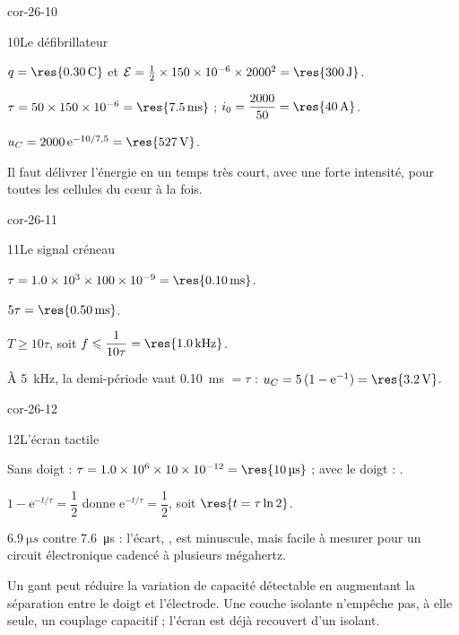 \begin{blocLivre}{cor-26-10}
\begin{corrige}{10}{Le défibrillateur}
\begin{questions}
\item $q=\res{\qty{0,30}{C}}$ et $\mathcal{E}=\frac12\times\num{150e-6}\times2000^2=\res{\qty{300}{J}}$.
\item $\tau=50\times\num{150e-6}=\res{\qty{7,5}{ms}}$ ; $i_0=\dfrac{2000}{50}=\res{\qty{40}{A}}$.
\item $u_C=2000\,\mathrm{e}^{-10/7{,}5}=\res{\qty{527}{V}}$.
\item Il faut délivrer l'énergie en un temps très court, avec une forte intensité, pour  toutes les
cellules du cœur à la fois.
\end{questions}
\end{corrige}
\end{blocLivre}
\begin{blocLivre}{cor-26-11}
\begin{corrige}{11}{Le signal créneau}
\begin{questions}
\item $\tau=\num{1.0e3}\times\num{100e-9}=\res{\qty{0,10}{ms}}$.
\item $5\tau=\res{\qty{0,50}{ms}}$.
\item $T\geqslant10\tau$, soit $f\leqslant\dfrac{1}{10\tau}=\res{\qty{1,0}{kHz}}$.
\item À \qty{5}{kHz}, la demi-période vaut \qty{0,10}{ms} $=\tau$ : $u_C=5\,(1-\mathrm{e}^{-1})=\res{\qty{3,2}{V}}$.
\end{questions}
\end{corrige}
\end{blocLivre}
\begin{blocLivre}{cor-26-12}
\begin{corrige}{12}{L'écran tactile}
\begin{questions}
\item Sans doigt : $\tau=\num{1.0e6}\times\num{10e-12}=\res{\qty{10}{\micro s}}$ ; avec le doigt : .
\item $1-\mathrm{e}^{-t/\tau}=\dfrac12$ donne $\mathrm{e}^{-t/\tau}=\dfrac12$, soit $\res{t=\tau\ln2}$.
\item $\qty{6,9}{\micro s}$ contre \qty{7,6}{\micro s} : l'écart, , est minuscule, mais facile à mesurer pour un
circuit électronique cadencé à plusieurs mégahertz.
\item Un gant peut réduire la variation de capacité détectable en augmentant la séparation entre le doigt et l’électrode. Une couche isolante n’empêche pas, à elle seule, un couplage capacitif ; l’écran est déjà recouvert d’un isolant.
\end{questions}
\end{corrige}
\end{blocLivre}
